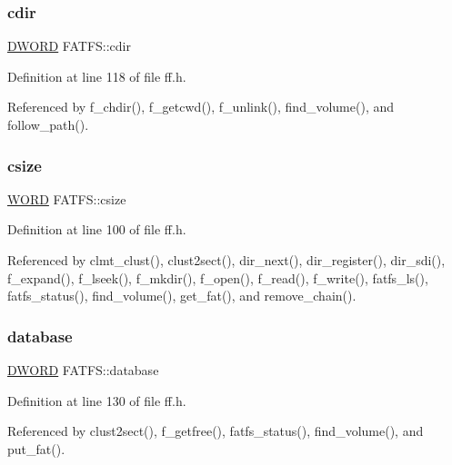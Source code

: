 \subsubsection{\texorpdfstring{cdir}{cdir}}
{\footnotesize\ttfamily \hyperlink{integer_8h_ad342ac907eb044443153a22f964bf0af}{D\+W\+O\+RD} F\+A\+T\+F\+S\+::cdir}



Definition at line 118 of file ff.\+h.



Referenced by f\+\_\+chdir(), f\+\_\+getcwd(), f\+\_\+unlink(), find\+\_\+volume(), and follow\+\_\+path().

\mbox{\label{structFATFS_ad7fa7a509f8d097a9ab182d6c47be568}} 
\subsubsection{\texorpdfstring{csize}{csize}}
{\footnotesize\ttfamily \hyperlink{integer_8h_a197942eefa7db30960ae396d68339b97}{W\+O\+RD} F\+A\+T\+F\+S\+::csize}



Definition at line 100 of file ff.\+h.



Referenced by clmt\+\_\+clust(), clust2sect(), dir\+\_\+next(), dir\+\_\+register(), dir\+\_\+sdi(), f\+\_\+expand(), f\+\_\+lseek(), f\+\_\+mkdir(), f\+\_\+open(), f\+\_\+read(), f\+\_\+write(), fatfs\+\_\+ls(), fatfs\+\_\+status(), find\+\_\+volume(), get\+\_\+fat(), and remove\+\_\+chain().

\mbox{\label{structFATFS_a5b6c0bc2e9fd2ae8ef714210a74a2d5d}} 
\subsubsection{\texorpdfstring{database}{database}}
{\footnotesize\ttfamily \hyperlink{integer_8h_ad342ac907eb044443153a22f964bf0af}{D\+W\+O\+RD} F\+A\+T\+F\+S\+::database}



Definition at line 130 of file ff.\+h.



Referenced by clust2sect(), f\+\_\+getfree(), fatfs\+\_\+status(), find\+\_\+volume(), and put\+\_\+fat().

